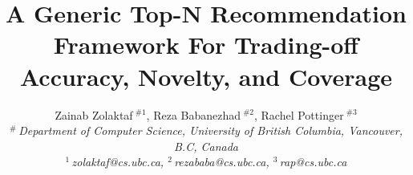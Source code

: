 \documentclass[10pt,conference,letterpaper]{IEEEtran}
\title{A Generic  Top-N  Recommendation Framework For Trading-off  Accuracy, Novelty, and Coverage}%
\author{%
{Zainab Zolaktaf{\small $~^{\#1}$}, Reza Babanezhad{\small $~^{\#2}$}, Rachel Pottinger{\small $~^{\#3}$} }%
\vspace{1.6mm}\\
\fontsize{10}{10}\selectfont\itshape
$^{\#}$\,Department of Computer Science, University of British Columbia, Vancouver, B.C, Canada\\
\fontsize{9}{9}\selectfont\ttfamily\upshape
%
$^{1}$\,zolaktaf@cs.ubc.ca,
$^{2}$\,rezababa@cs.ubc.ca,
$^{3}$\,rap@cs.ubc.ca%
\vspace{1.2mm}\\
\fontsize{10}{10}\selectfont\rmfamily\itshape
\iffalse
$^{*}$\,Second Company\\
Address Including Country Name\\
\fontsize{9}{9}\selectfont\ttfamily\upshape
$^{2}$\,second.author@second.com
\fi
}
\begin{document}
\maketitle
%
\begin{abstract}

\end{abstract}


%




\small
 
\iffullpaper 

\fi
\end{document}
